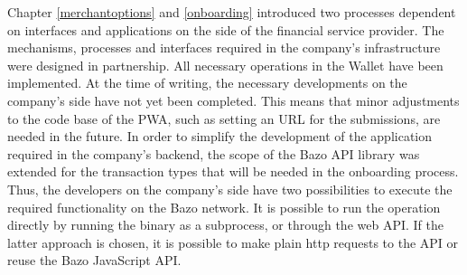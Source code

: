 Chapter \ref{merchantoptions} and \ref{onboarding} introduced two processes dependent on interfaces and applications on the side of the financial service provider. The mechanisms, processes and interfaces required in the company's infrastructure were designed in partnership. All necessary operations in the Wallet have been implemented. At the time of writing, the necessary developments on the company's side have not yet been completed. This means that minor adjustments to the code base of the PWA, such as setting an URL for the submissions, are needed in the future. In order to simplify the development of the application required in the company's backend, the scope of the Bazo API library was extended for the transaction types that will be needed in the onboarding process. Thus, the developers on the company's side have two possibilities to execute the required functionality on the Bazo network. It is possible to run the operation directly by running the binary as a subprocess, or through the web API. If the latter approach is chosen, it is possible to make plain http requests to the API or reuse the Bazo JavaScript API.
\newpage
